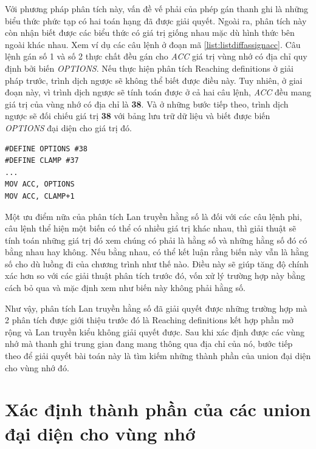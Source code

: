 Với phương pháp phân tích này, vấn đề vế phải của phép gán thanh ghi là những biểu thức phức tạp có hai toán hạng đã được giải quyết. Ngoài ra, phân tích này còn nhận biết được các biểu thức có giá trị giống nhau mặc dù hình thức bên ngoài khác nhau. Xem ví dụ các câu lệnh ở đoạn mã \ref{list:listdiffassignacc}. Câu lệnh gán số 1 và số 2 thực chất đều gán cho \textit{ACC} giá trị vùng nhớ có địa chỉ quy định bởi biến \textit{OPTIONS}. Nếu thực hiện phân tích Reaching definitions ở giải pháp trước, trình dịch ngược sẽ không thể biết được điều này. Tuy nhiên, ở giai đoạn này, vì trình dịch ngược sẽ tính toán được ở cả hai câu lệnh, \textit{ACC} đều mang giá trị của vùng nhớ có địa chỉ là \textbf{38}. Và ở những bước tiếp theo, trình dịch ngược sẽ đối chiếu giá trị \textbf{38} với bảng lưu trữ dữ liệu và biết được biến \textit{OPTIONS} đại diện cho giá trị đó.

\begin{lstlisting}[caption={Một số câu lệnh gán cho ACC có giá trị vế phải bằng nhau},label={list:listdiffassignacc}]
#DEFINE OPTIONS #38
#DEFINE CLAMP #37
...
MOV ACC, OPTIONS
MOV ACC, CLAMP+1
\end{lstlisting}

Một ưu điểm nữa của phân tích Lan truyền hằng số là đối với các câu lệnh phi, câu lệnh thể hiện một biến có thể có nhiều giá trị khác nhau, thì giải thuật sẽ tính toán những giá trị đó xem chúng có phải là hằng số và những hằng số đó có bằng nhau hay không. Nếu bằng nhau, có thể kết luận rằng biến này vẫn là hằng số cho dù luồng đi của chương trình như thế nào. Điều này sẽ giúp tăng độ chính xác hơn so với các giải thuật phân tích trước đó, vốn xử lý trường hợp này bằng cách bỏ qua và mặc định xem như biến này không phải hằng số.

Như vậy, phân tích Lan truyền hằng số đã giải quyết được những trường hợp mà 2 phân tích được giới thiệu trước đó là Reaching definitions kết hợp phần mở rộng và Lan truyền kiểu không giải quyết được. Sau khi xác định được các vùng nhớ mà thanh ghi trung gian đang mang thông qua địa chỉ của nó, bước tiếp theo để giải quyết bài toán này là tìm kiếm những thành phần của union đại diện cho vùng nhớ đó.
\section{Xác định thành phần của các union đại diện cho vùng nhớ}

